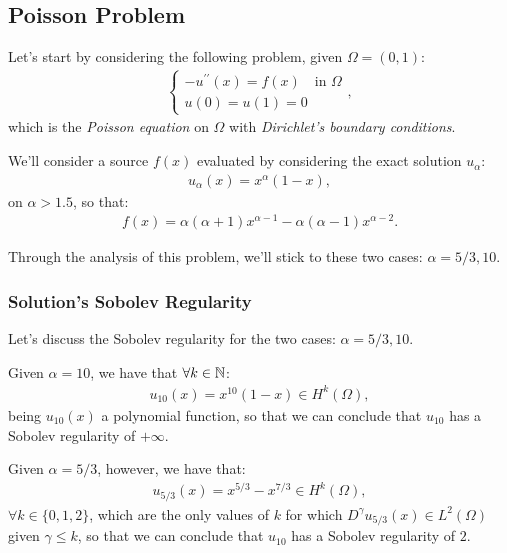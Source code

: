 \subsection{Poisson Problem}

Let's start by considering the following problem, given $\Omega = (0, 1)$:
\begin{gather}
	\begin{cases}
		-u^{\prime \prime}(x) = f(x) \quad \text{in } \Omega \\
		u(0) = u(1) = 0
	\end{cases},
\end{gather}
which is the \textit{Poisson equation} on $\Omega$ with \textit{Dirichlet's boundary conditions}.

We'll consider a source $f(x)$ evaluated by considering the exact solution $u_{\alpha}$:
\begin{gather}
	u_{\alpha}(x) = x^{\alpha} (1 - x),
\end{gather}
on $\alpha > 1.5$, so that:
\begin{gather}
	f(x) = \alpha (\alpha + 1) x^{\alpha - 1} - \alpha (\alpha - 1) x^{\alpha - 2}.
\end{gather}

Through the analysis of this problem, we'll stick to these two cases: $\alpha = 5/3, 10$.

\subsubsection{Solution's Sobolev Regularity} \label{sob_regularity}

Let's discuss the Sobolev regularity for the two cases: $\alpha = 5/3, 10$.

Given $\alpha = 10$, we have that $\forall k \in \mathbb{N}$:
\begin{gather}
	u_{10}(x) = x^{10} (1 - x) \in H^{k}(\Omega),
\end{gather}
being $u_{10}(x)$ a polynomial function, so that we can conclude that $u_{10}$ has a Sobolev regularity of $+\infty$.

Given $\alpha = 5/3$, however, we have that:
\begin{gather}
	u_{5/3}(x) = x^{5/3} - x^{7/3} \in H^{k}(\Omega),
\end{gather}
$\forall k \in \{0, 1, 2\}$, which are the only values of $k$ for which $D^{\gamma} u_{5/3}(x) \in L^2(\Omega)$ given $\gamma \le k$, so that we can conclude that $u_{10}$ has a Sobolev regularity of $2$.

